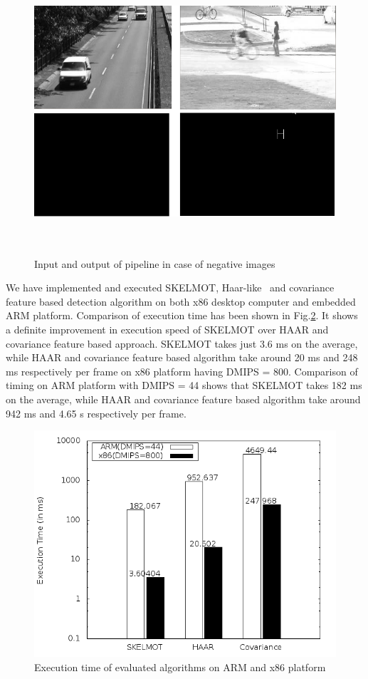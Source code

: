 \begin{figure}[!b]
\centering
\includegraphics[height=300pt]{Figures/negative_inputs}
\caption{Input and output of pipeline in case of negative images}
\label{negative_inputs}
\end{figure}

\indent We have implemented and executed SKELMOT, Haar-like~\cite{19} and
covariance~\cite{19} feature based detection algorithm on both x86
desktop computer and embedded ARM platform. Comparison of execution time
has been shown in Fig.\ref{pipeline_execution_time}. It shows a
definite improvement in execution speed of SKELMOT over HAAR and covariance
feature based approach.  SKELMOT takes just 3.6 ms on the average, while
HAAR and covariance feature based algorithm take around 20 ms and 248 ms
respectively per frame on x86 platform having DMIPS = 800. Comparison of
timing on ARM platform with DMIPS = 44 shows that SKELMOT takes 182 ms
on the average, while HAAR and covariance feature based algorithm take
around 942 ms and 4.65 s respectively per frame.  \\
\begin{figure}[!h]
\centering
\includegraphics[scale=0.30]{Figures/pipeline_execution_time}
\caption{Execution time of evaluated algorithms on ARM and x86
platform}
\label{pipeline_execution_time}
\end{figure}
